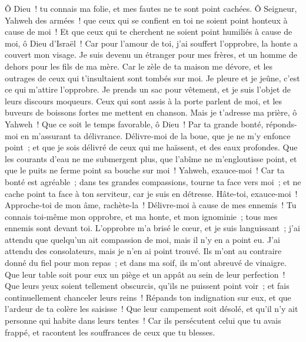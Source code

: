 \begin{multicols}{2}
Ô Dieu~! tu connais ma folie, et mes fautes ne te sont point cachées.
Ô Seigneur, Yahweh des armées~! que ceux qui se confient en toi ne soient point honteux à cause de moi~! Et que ceux qui te cherchent ne soient point humiliés à cause de moi, ô Dieu d'Israël~!
Car pour l'amour de toi, j'ai souffert l'opprobre, la honte a couvert mon visage.
Je suis devenu un étranger pour mes frères, et un homme de dehors pour les fils de ma mère.
Car le zèle de ta maison me dévore, et les outrages de ceux qui t'insultaient sont tombés sur moi.
Je pleure et je jeûne, c'est ce qui m'attire l'opprobre.
Je prends un sac pour vêtement, et je suis l'objet de leurs discours moqueurs.
Ceux qui sont assis à la porte parlent de moi, et les buveurs de boissons fortes me mettent en chanson.
Mais je t'adresse ma prière, ô Yahweh~! Que ce soit le temps favorable, ô Dieu~! Par ta grande bonté, réponds-moi en m'assurant ta délivrance.
Délivre-moi de la boue, que je ne m'y enfonce point~; et que je sois délivré de ceux qui me haïssent, et des eaux profondes.
Que les courants d'eau ne me submergent plus, que l'abîme ne m'engloutisse point, et que le puits ne ferme point sa bouche sur moi~!
Yahweh, exauce-moi~! Car ta bonté est agréable~; dans tes grandes compassions, tourne ta face vers moi~;
et ne cache point ta face à ton serviteur, car je suis en détresse. Hâte-toi, exauce-moi~!
Approche-toi de mon âme, rachète-la~! Délivre-moi à cause de mes ennemis~!
Tu connais toi-même mon opprobre, et ma honte, et mon ignominie~; tous mes ennemis sont devant toi.
L'opprobre m'a brisé le cœur, et je suis languissant~; j'ai attendu que quelqu'un ait compassion de moi, mais il n'y en a point eu. J'ai attendu des consolateurs, mais je n'en ai point trouvé.
Ils m'ont au contraire donné du fiel pour mon repas~; et dans ma soif, ils m'ont abreuvé de vinaigre.
Que leur table soit pour eux un piège et un appât au sein de leur perfection~!
Que leurs yeux soient tellement obscurcis, qu'ils ne puissent point voir~; et fais continuellement chanceler leurs reins~!
Répands ton indignation sur eux, et que l'ardeur de ta colère les saisisse~!
Que leur campement soit désolé, et qu'il n'y ait personne qui habite dans leurs tentes~!
Car ils persécutent celui que tu avais frappé, et racontent les souffrances de ceux que tu blesses.

\end{multicols}
